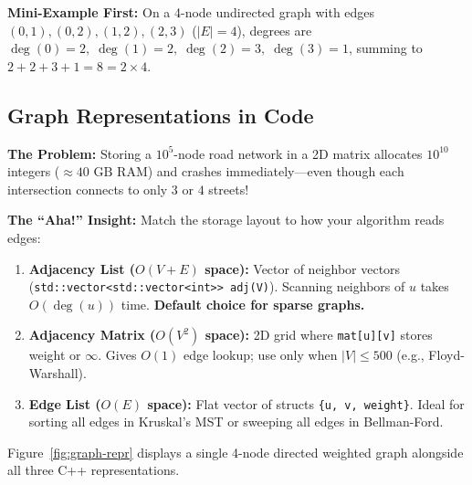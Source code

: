 \documentclass[11pt,a4paper]{article}
\theoremstyle{definition}
\newcommand{\painbeat}{\textbf{\color{accentamber}The Problem:} }
\newcommand{\ahabeat}{\textbf{\color{accentteal}The ``Aha!'' Insight:} }
\newcommand{\examplebeat}{\textbf{\color{primaryblue}Mini-Example First:} }
\begin{document}
\examplebeat On a 4-node undirected graph with edges $(0,1), (0,2), (1,2), (2,3)$ ($|E| = 4$), degrees are $\deg(0) = 2,\; \deg(1) = 2,\; \deg(2) = 3,\; \deg(3) = 1$, summing to $2 + 2 + 3 + 1 = 8 = 2 \times 4$.

\subsection{Graph Representations in Code}

\painbeat Storing a $10^5$-node road network in a 2D matrix allocates $10^{10}$ integers ($\approx 40\text{ GB}$ RAM) and crashes immediately---even though each intersection connects to only $3$ or $4$ streets!

\ahabeat Match the storage layout to how your algorithm reads edges:
\begin{enumerate}
    \item \textbf{Adjacency List ($O(V + E)$ space):} Vector of neighbor vectors (\texttt{std::vector<std::vector<int>> adj(V)}). Scanning neighbors of $u$ takes $O(\deg(u))$ time. \textbf{Default choice for sparse graphs.}
    \item \textbf{Adjacency Matrix ($O(V^2)$ space):} 2D grid where \texttt{mat[u][v]} stores weight or $\infty$. Gives $O(1)$ edge lookup; use only when $|V| \le 500$ (e.g., Floyd-Warshall).
    \item \textbf{Edge List ($O(E)$ space):} Flat vector of structs \texttt{\{u, v, weight\}}. Ideal for sorting all edges in Kruskal's MST or sweeping all edges in Bellman-Ford.
\end{enumerate}

Figure~\ref{fig:graph-repr} displays a single 4-node directed weighted graph alongside all three C++ representations.
\end{document}
